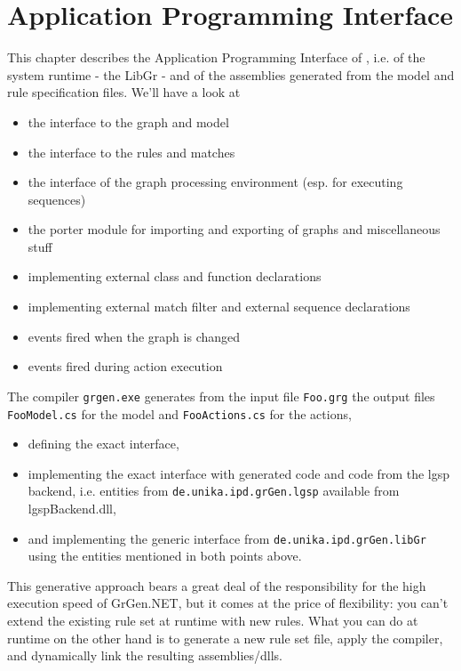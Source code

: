 \chapter{Application Programming Interface} 
\label{cha:api}

This chapter describes the Application Programming Interface of \GrG, i.e. of the system runtime - the LibGr - and of the assemblies generated from the model and rule specification files.
We'll have a look at
\begin{itemize}
\item the interface to the graph and model
\item the interface to the rules and matches
\item the interface of the graph processing environment (esp. for executing sequences)
\item the porter module for importing and exporting of graphs and miscellaneous stuff
\item implementing external class and function declarations
\item implementing external match filter and external sequence declarations
\item events fired when the graph is changed
\item events fired during action execution
\end{itemize}

\noindent The compiler \texttt{grgen.exe} generates from the input file \texttt{Foo.grg} the output files \texttt{FooModel.cs} for the model and \texttt{FooActions.cs} for the actions,
\begin{itemize}
\item defining the exact interface, 
\item implementing the exact interface with generated code and code from the lgsp backend, i.e. entities from \texttt{de.unika.ipd.grGen.lgsp} available from lgspBackend.dll, 
\item and implementing the generic interface from \texttt{de.unika.ipd.grGen.libGr} using the entities mentioned in both points above.
\end{itemize}

\noindent This generative approach bears a great deal of the responsibility for the high execution speed of GrGen.NET, but it comes at the price of flexibility: you can't extend the existing rule set at runtime with new rules.
What you can do at runtime on the other hand is to generate a new rule set file, apply the compiler, and dynamically link the resulting assemblies/dlls.

